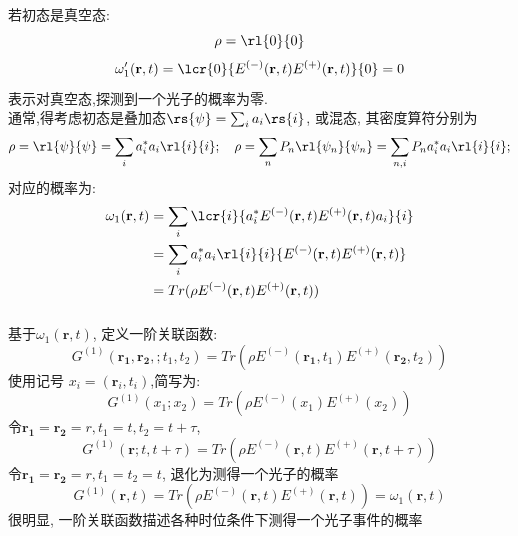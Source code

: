  \begin{frame} 
  \frametitle{}
       若初态是真空态:
       \[ \rho = \rl{0 }{0 }\]
       \[\omega'_1(\mathbf{r}, t)= \lcr{0}{E^{(-)}(\mathbf{r}, t)E^{(+)}(\mathbf{r}, t)}{0} =0 \]
       表示对真空态,探测到一个光子的概率为零. \\ 
      通常,得考虑初态是叠加态$\rs{\psi} = \sum_i a_i\rs{i}$, 或混态, 其密度算符分别为
       \[\rho = \rl{\psi}{\psi} = \sum_i a^*_i a_i\rl{i}{i}; \quad \rho = \sum_n P_n\rl{\psi_n}{\psi_n} = \sum_{n,i} P_n a^*_i a_i\rl{i}{i};  \]
       对应的概率为:
    \[\begin{aligned}
        \omega_1(\mathbf{r}, t)
        &= \sum_i \lcr{i}{a^* _i E^{(-)}(\mathbf{r}, t)E^{(+)}(\mathbf{r}, t) a_i}{i} \\ 
        &= \sum_i a^*_i a_i\rl{i}{i}{E^{(-)}(\mathbf{r}, t)E^{(+)}(\mathbf{r}, t)} \\ 
        &= Tr( \rho E^{(-)}(\mathbf{r}, t)E^{(+)}(\mathbf{r}, t))
    \end{aligned} \] 
 \end{frame}

\begin{frame} 
    \frametitle{}
    基于$\omega_1(\mathbf{r}, t)$, 定义一阶关联函数:
    \[ G^{(1)}(\mathbf{r_1}, \mathbf{r_2},; t_1, t_2) = Tr( \rho E^{(-)}(\mathbf{r_1}, t_1)E^{(+)}(\mathbf{r_2}, t_2)) \]   
    使用记号 $x_i= (\mathbf{r}_i, t_i)$,简写为:
    \[ G^{(1)}(x_1; x_2) = Tr( \rho E^{(-)}(x_1)E^{(+)}(x_2)) \]  
    令$\mathbf{r_1}=\mathbf{r_2}=r,t_1=t, t_2=t+\tau$, 
    \[ G^{(1)}(\mathbf{r} ;t, t+\tau) = Tr( \rho E^{(-)}(\mathbf{r}, t)E^{(+)}(\mathbf{r}, t+\tau)) \] 
    令$\mathbf{r_1}=\mathbf{r_2}=r,t_1=t_2=t$, 退化为测得一个光子的概率
    \[ G^{(1)}(\mathbf{r}, t) = Tr( \rho E^{(-)}(\mathbf{r}, t)E^{(+)}(\mathbf{r}, t))=\omega_1(\mathbf{r}, t) \] 
    很明显, 一阶关联函数描述各种时位条件下测得一个光子事件的概率
   \end{frame}

